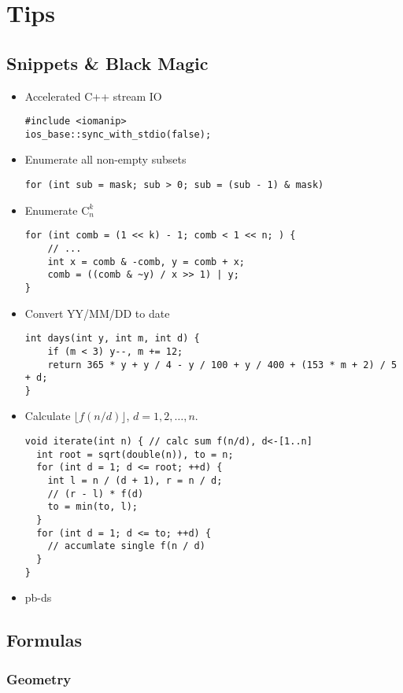 \documentclass[10pt]{article}
\begin{document}
{\section{Tips}
\subsection{Snippets \& Black Magic}
\begin{itemize}
\item Accelerated C++ stream IO
\begin{lstlisting}[frame=none]
#include <iomanip>
ios_base::sync_with_stdio(false);
\end{lstlisting}
\item Enumerate all non-empty subsets
\begin{lstlisting}[frame=none]
for (int sub = mask; sub > 0; sub = (sub - 1) & mask)
\end{lstlisting}
\item Enumerate $\mathrm{C}_{n}^{k}$
\begin{lstlisting}[frame=none]
for (int comb = (1 << k) - 1; comb < 1 << n; ) {
	// ...
	int x = comb & -comb, y = comb + x;
	comb = ((comb & ~y) / x >> 1) | y;
}
\end{lstlisting}
\item Convert YY/MM/DD to date
\begin{lstlisting}[frame=none]
int days(int y, int m, int d) {
	if (m < 3) y--, m += 12;
	return 365 * y + y / 4 - y / 100 + y / 400 + (153 * m + 2) / 5 + d;
}
\end{lstlisting}
\item Calculate $\lfloor f(n/d) \rfloor$, $d=1, 2, \ldots, n$.
\begin{lstlisting}[frame=none]
void iterate(int n) { // calc sum f(n/d), d<-[1..n]
  int root = sqrt(double(n)), to = n;
  for (int d = 1; d <= root; ++d) {
    int l = n / (d + 1), r = n / d;
    // (r - l) * f(d)
    to = min(to, l);
  }
  for (int d = 1; d <= to; ++d) {
    // accumlate single f(n / d)
  }
}
\end{lstlisting}
\item pb-ds

\end{itemize}
\subsection{Formulas}
\subsubsection{Geometry}
}
\end{document}
